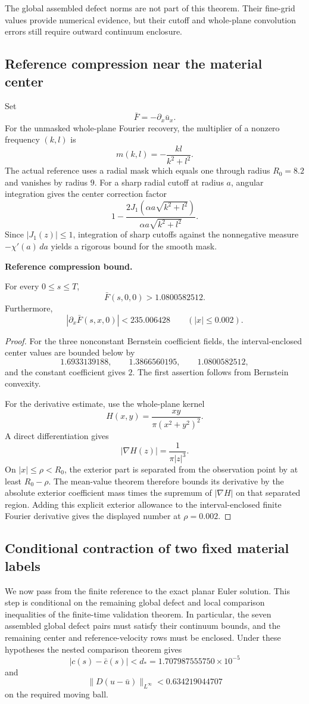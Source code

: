 \documentclass[11pt]{article}
\theoremstyle{definition}\newtheorem{definition}[theorem]{Definition}\newtheorem{problem}[theorem]{Problem}
\theoremstyle{remark}\newtheorem{remark}[theorem]{Remark}
\begin{document}
The global assembled defect norms are not part of this theorem.  Their fine-grid values provide numerical evidence, but their cutoff and whole-plane convolution errors still require outward continuum enclosure.

\subsection{Reference compression near the material center}
Set
\[
\bar F=-\partial_x\bar u_x.
\]
For the unmasked whole-plane Fourier recovery, the multiplier of a nonzero frequency $(k,l)$ is
\[
m(k,l)=-\frac{kl}{k^2+l^2}.
\]
The actual reference uses a radial mask which equals one through radius $R_0=8.2$ and vanishes by radius $9$.  For a sharp radial cutoff at radius $a$, angular integration gives the center correction factor
\[
1-\frac{2J_1(\alpha a\sqrt{k^2+l^2})}
{\alpha a\sqrt{k^2+l^2}}.
\]
Since $|J_1(z)|\le1$, integration of sharp cutoffs against the nonnegative measure $-\chi'(a)\,da$ yields a rigorous bound for the smooth mask.

\medskip
\noindent\textbf{Reference compression bound.}
\begin{proposition}\label{prop:reference-compression}
For every $0\le s\le T$,
\[
\bar F(s,0,0)>1.0800582512.
\]
Furthermore,
\[
|\partial_x\bar F(s,x,0)|<235.006428
\qquad (|x|\le0.002).
\]
\end{proposition}
\begin{proof}
For the three nonconstant Bernstein coefficient fields, the interval-enclosed center values are bounded below by
\[
1.6933139188,\qquad1.3866560195,\qquad1.0800582512,
\]
and the constant coefficient gives $2$.  The first assertion follows from Bernstein convexity.

For the derivative estimate, use the whole-plane kernel
\[
H(x,y)=\frac{xy}{\pi(x^2+y^2)^2}.
\]
A direct differentiation gives
\[
|\nabla H(z)|=\frac1{\pi|z|^3}.
\]
On $|x|\le\rho<R_0$, the exterior part is separated from the observation point by at least $R_0-\rho$.  The mean-value theorem therefore bounds its derivative by the absolute exterior coefficient mass times the supremum of $|\nabla H|$ on that separated region.  Adding this explicit exterior allowance to the interval-enclosed finite Fourier derivative gives the displayed number at $\rho=0.002$.
\end{proof}

\subsection{Conditional contraction of two fixed material labels}
We now pass from the finite reference to the exact planar Euler solution.  This step is conditional on the remaining global defect and local comparison inequalities of the finite-time validation theorem.  In particular, the seven assembled global defect pairs must satisfy their continuum bounds, and the remaining center and reference-velocity rows must be enclosed.  Under these hypotheses the nested comparison theorem gives
\[
|c(s)-\bar c(s)|<d_*=1.707987555750\times10^{-5}
\]
and
\[
\|D(u-\bar u)\|_{L^\infty}<0.634219044707
\]
on the required moving ball.
\end{document}
